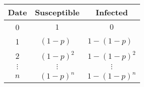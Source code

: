 \begin{table}[h]\label{table:SIDyn}
\centering
    \begin{tabular}{ccc}
        \hline
        Date & Susceptible & Infected \\
        \hline
        0 & $1$  &  $0$ \\
        \hline
        1 & $(1-p)\phantom{^2}$ & $1-(1-p)\phantom{^2}$ \\
        \hline
        2 & $(1-p)^{2}$ & $1-(1-p)^{2}$ \\
        \hline
        $\vdots$ & $\vdots$ & $\vdots$ \\
        \hline
        $n$ & $(1-p)^{n}$ & $1-(1-p)^{n}$ \\
        \hline
    \end{tabular}
\end{table}
